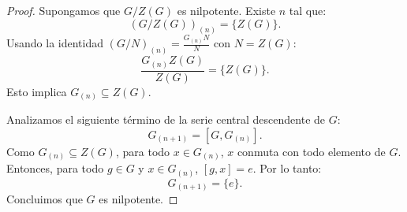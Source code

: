 \begin{proof}
    Supongamos que $G/Z(G)$ es nilpotente. Existe $n$ tal que:
    \begin{equation*}
        (G/Z(G))_{(n)} = \{Z(G)\}.
    \end{equation*}
    Usando la identidad $(G/N)_{(n)} = \frac{G_{(n)}N}{N}$ con $N=Z(G)$:
    \begin{equation*}
        \frac{G_{(n)}Z(G)}{Z(G)} = \{Z(G)\}.
    \end{equation*}
    Esto implica $G_{(n)} \subseteq Z(G)$.
    
    Analizamos el siguiente término de la serie central descendente de $G$:
    \begin{equation*}
        G_{(n+1)} = [G, G_{(n)}].
    \end{equation*}
    Como $G_{(n)} \subseteq Z(G)$, para todo $x \in G_{(n)}$, $x$ conmuta con todo elemento de $G$.
    Entonces, para todo $g \in G$ y $x \in G_{(n)}$, $[g, x] = e$.
    Por lo tanto:
    \begin{equation*}
        G_{(n+1)} = \{e\}.
    \end{equation*}
    Concluimos que $G$ es nilpotente.
\end{proof}